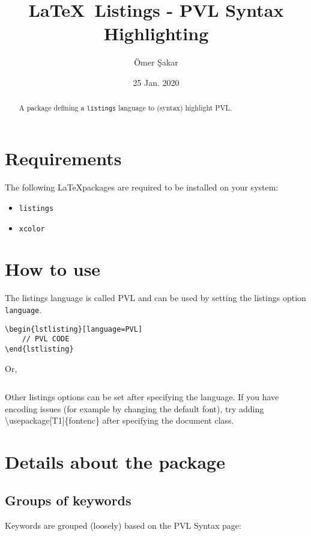 \documentclass[a4paper]{scrartcl}
\title{\LaTeX\ Listings - PVL Syntax Highlighting}
\date{25 Jan. 2020}
\author{\"Omer \c{S}akar}
\begin{document}
\maketitle

\begin{abstract}
	A package defining a \texttt{listings} language to (syntax) highlight PVL.
\end{abstract}

\tableofcontents

\section{Requirements}
The following \LaTeX packages are required to be installed on your system:
\begin{itemize}
	\setlength\itemsep{0cm}
	\item \texttt{listings}
	\item \texttt{xcolor}
\end{itemize}

\section{How to use}
The listings language is called PVL and can be used by setting the listings option \texttt{language}.

\begin{verbatim}
\begin{lstlisting}[language=PVL]
    // PVL CODE
\end{lstlisting}
\end{verbatim}

Or,

\begin{verbatim}

\end{verbatim}

Other listings options can be set after specifying the language. If you have encoding issues (for example by changing the default font), try adding \textbackslash usepackage[T1]\{fontenc\} after specifying the document class. 
 
\section{Details about the package}
\subsection{Groups of keywords}
Keywords are grouped (loosely) based on the PVL Syntax page:
\end{document}

